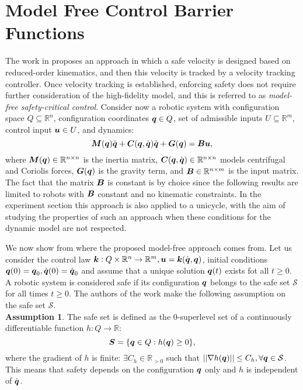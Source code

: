 \section{Model Free Control Barrier Functions}
The work in \cite{mf_cbf} proposes an approach in which a safe velocity is designed based on reduced-order kinematics, and then this velocity is tracked by a velocity tracking controller. Once velocity tracking is established, enforcing safety does not require further consideration of the high-fidelity model, and this is referred to as \textit{model-free safety-critical control}.
Consider now a robotic system with configuration space $Q \subseteq \mathbb{R}^n$, configuration coordinates ${\boldsymbol{q}} \in Q$, set of admissible inputs $U\subseteq \mathbb{R}^m$, control input $\boldsymbol{u} \in U$, and dynamics:
\begin{equation} \label{eq:dynamic model}
    \boldsymbol{M}({\boldsymbol{q}})\ddot{{\boldsymbol{q}}}+\boldsymbol{C}({\boldsymbol{q}},\dot{{\boldsymbol{q}}})\dot{{\boldsymbol{q}}}+\boldsymbol{G}({\boldsymbol{q}})=\boldsymbol{B}\boldsymbol{u},
\end{equation}
where $\boldsymbol{M}({\boldsymbol{q}})\in\mathbb{R}^{n \times n}$ is the inertia matrix, $\boldsymbol{C}({\boldsymbol{q}},\dot{{\boldsymbol{q}}})\in\mathbb{R}^{n \times n}$ models centrifugal and Coriolis forces, $\boldsymbol{G}({\boldsymbol{q}})$ is the gravity term, and $\boldsymbol{B}\in\mathbb{R}^{n \times m}$ is the input matrix. The fact that the matrix $\boldsymbol{B}$ is constant is by choice since the following results are limited to robots with $\boldsymbol{B}$ constant and no kinematic constraints. In the experiment section this approach is also applied to a unicycle, with the aim of studying the properties of such an approach when these conditions for the dynamic model are not respected.

We now show from where the proposed model-free approach comes from. Let us consider the control law $ \boldsymbol{k}:Q\times \mathbb{R}^n \rightarrow \mathbb{R}^m, \boldsymbol{u}=\boldsymbol{k}(\dot{{\boldsymbol{q}}},{\boldsymbol{q}})$, initial conditions ${\boldsymbol{q}}(0) = {\boldsymbol{q}}_0, \dot{{\boldsymbol{q}}}(0)=\dot{{\boldsymbol{q}}}_0$ and assume that a unique solution ${\boldsymbol{q}}(t)$ exists fot all $t \geq 0$. A robotic system is considered safe if its configuration ${\boldsymbol{q}}$ belongs to the safe set $\mathcal{S}$ for all times $t\geq 0$. The authors of the work \cite{mf_cbf} make the following assumption on the safe set $\mathcal{S}$.\\
\textbf{Assumption 1}. The safe set is defined as the 0-superlevel set of a continuously differentiable function $h: Q \rightarrow \mathbb{R}$:
\begin{equation} \label{eq:safe set}
    \mathcal{\boldsymbol{S}} = \{{\boldsymbol{q}} \in Q: h({\boldsymbol{q}})\geq 0 \},
\end{equation}
where the gradient of $h$ is finite: $\exists C_h \in \mathbb{R}_{>0}$ such that $|| \nabla h({\boldsymbol{q}})|| \leq C_h, \forall {\boldsymbol{q}} \in \mathcal{S}$. This means that safety depends on the configuration ${\boldsymbol{q}}$ only and $h$ is independent of $\dot{{\boldsymbol{q}}}$.


